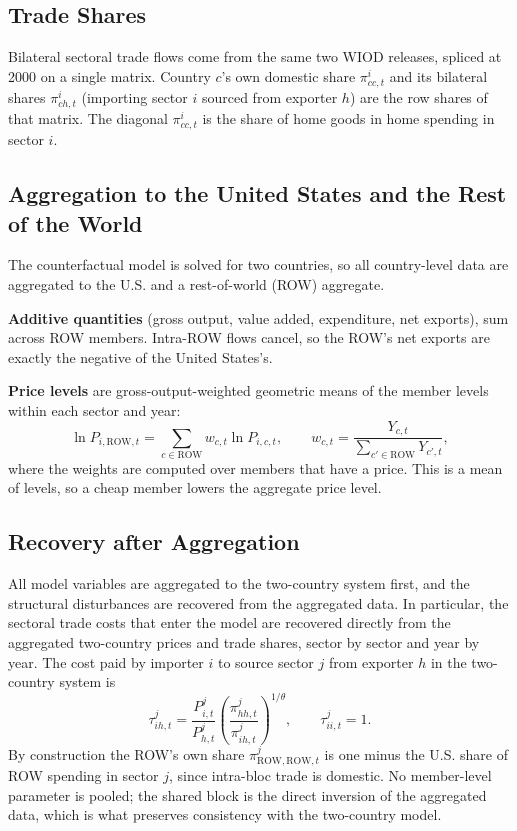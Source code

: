 \documentclass{article}
\begin{document}
\subsection*{Trade Shares}

Bilateral sectoral trade flows come from the same two WIOD releases, spliced at 2000 on a single
matrix. Country $c$'s own domestic share $\pi_{cc,t}^{i}$ and its bilateral shares $\pi_{ch,t}^{i}$
(importing sector $i$ sourced from exporter $h$) are the row shares of that matrix. The diagonal
$\pi_{cc,t}^{i}$ is the share of home goods in home spending in sector $i$.

\subsection*{Aggregation to the United States and the Rest of the World}

The counterfactual model is solved for two countries, so all country-level data are aggregated to
the U.S. and a rest-of-world (ROW) aggregate.

\textbf{Additive quantities} (gross output, value added, expenditure, net exports), sum across ROW
members. Intra-ROW flows cancel, so the ROW's net exports are exactly the negative of the United
States's.

\textbf{Price levels} are gross-output-weighted geometric means of the member levels within each
sector and year:
\begin{equation}
    \ln P_{i,\text{ROW},t} = \sum_{c \in \text{ROW}} w_{c,t} \ln P_{i,c,t},
    \qquad
    w_{c,t} = \frac{Y_{c,t}}{\sum_{c'\in \text{ROW}} Y_{c',t}},
\end{equation}
where the weights are computed over members that have a price. This is a mean of levels, so a cheap
member lowers the aggregate price level.

\subsection*{Recovery after Aggregation}

All model variables are aggregated to the two-country system first, and the structural disturbances
are recovered from the aggregated data. In particular, the sectoral trade costs that enter the model
are recovered directly from the aggregated two-country prices and trade shares, sector by sector and
year by year. The cost paid by importer $i$ to source sector $j$ from exporter $h$ in the
two-country system is
\begin{equation}
    \tau_{ih,t}^{j} = \frac{P_{i,t}^{j}}{P_{h,t}^{j}} \left(\frac{\pi_{hh,t}^{j}}{\pi_{ih,t}^{j}}\right)^{1/\theta},
    \qquad \tau_{ii,t}^{j} = 1.
\end{equation}
By construction the ROW's own share $\pi_{\text{ROW},\text{ROW},t}^{j}$ is one minus the U.S. share of
ROW spending in sector $j$, since intra-bloc trade is domestic. No member-level parameter is pooled;
the shared block is the direct inversion of the aggregated data, which is what preserves consistency
with the two-country model.
\end{document}
